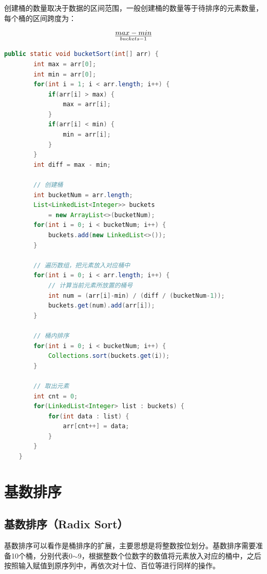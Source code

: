 创建桶的数量取决于数据的区间范围，一般创建桶的数量等于待排序的元素数量，每个桶的区间跨度为：

$$
	max - min \over buckets - 1
$$

\vspace{0.5cm}


\begin{lstlisting}[language=Java]
public static void bucketSort(int[] arr) {
        int max = arr[0];
        int min = arr[0];
        for(int i = 1; i < arr.length; i++) {
            if(arr[i] > max) {
                max = arr[i];
            }
            if(arr[i] < min) {
                min = arr[i];
            }
        }
        int diff = max - min;

        // 创建桶
        int bucketNum = arr.length;
        List<LinkedList<Integer>> buckets 
            = new ArrayList<>(bucketNum);
        for(int i = 0; i < bucketNum; i++) {
            buckets.add(new LinkedList<>());
        }

        // 遍历数组，把元素放入对应桶中
        for(int i = 0; i < arr.length; i++) {
            // 计算当前元素所放置的桶号
            int num = (arr[i]-min) / (diff / (bucketNum-1));
            buckets.get(num).add(arr[i]);
        }

        // 桶内排序
        for(int i = 0; i < bucketNum; i++) {
            Collections.sort(buckets.get(i));
        }

        // 取出元素
        int cnt = 0;
        for(LinkedList<Integer> list : buckets) {
            for(int data : list) {
                arr[cnt++] = data;
            }
        }
    }
\end{lstlisting}

\newpage

\section{基数排序}

\subsection{基数排序（Radix Sort）}

基数排序可以看作是桶排序的扩展，主要思想是将整数按位划分。基数排序需要准备10个桶，分别代表0$ \sim $9，根据整数个位数字的数值将元素放入对应的桶中，之后按照输入赋值到原序列中，再依次对十位、百位等进行同样的操作。\\


